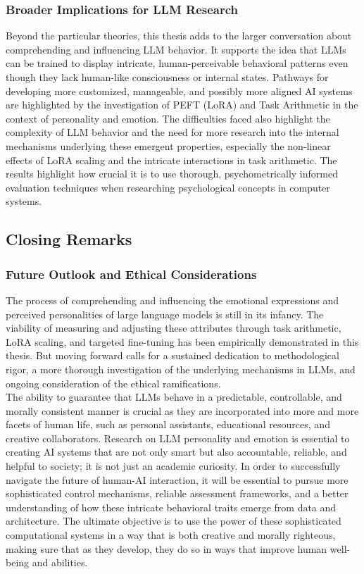 \documentclass{DESSThesis}
\begin{document}
\subsubsection{Broader Implications for LLM Research}
Beyond the particular theories, this thesis adds to the larger conversation about comprehending and influencing LLM behavior. It supports the idea that LLMs can be trained to display intricate, human-perceivable behavioral patterns even though they lack human-like consciousness or internal states. Pathways for developing more customized, manageable, and possibly more aligned AI systems are highlighted by the investigation of PEFT (LoRA) and Task Arithmetic in the context of personality and emotion. The difficulties faced also highlight the complexity of LLM behavior and the need for more research into the internal mechanisms underlying these emergent properties, especially the non-linear effects of LoRA scaling and the intricate interactions in task arithmetic. The results highlight how crucial it is to use thorough, psychometrically informed evaluation techniques when researching psychological concepts in computer systems.

\subsection{Closing Remarks}

\subsubsection{Future Outlook and Ethical Considerations}
The process of comprehending and influencing the emotional expressions and perceived personalities of large language models is still in its infancy. The viability of measuring and adjusting these attributes through task arithmetic, LoRA scaling, and targeted fine-tuning has been empirically demonstrated in this thesis. But moving forward calls for a sustained dedication to methodological rigor, a more thorough investigation of the underlying mechanisms in LLMs, and ongoing consideration of the ethical ramifications.
\\
The ability to guarantee that LLMs behave in a predictable, controllable, and morally consistent manner is crucial as they are incorporated into more and more facets of human life, such as personal assistants, educational resources, and creative collaborators. Research on LLM personality and emotion is essential to creating AI systems that are not only smart but also accountable, reliable, and helpful to society; it is not just an academic curiosity. In order to successfully navigate the future of human-AI interaction, it will be essential to pursue more sophisticated control mechanisms, reliable assessment frameworks, and a better understanding of how these intricate behavioral traits emerge from data and architecture. The ultimate objective is to use the power of these sophisticated computational systems in a way that is both creative and morally righteous, making sure that as they develop, they do so in ways that improve human well-being and abilities.
\end{document}
